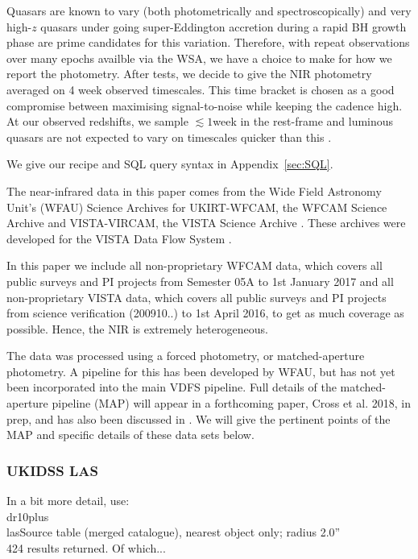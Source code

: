 \documentclass[usenatbib]{mnras}
\begin{document}
Quasars are known to vary (both photometrically and spectroscopically)
and very high-$z$ quasars under going super-Eddington accretion during
a rapid BH growth phase are prime candidates for this variation.
Therefore, with repeat observations over many epochs availble via the
WSA, we have a choice to make for how we report the photometry. After
tests, we decide to give the NIR photometry averaged on 4 week
observed timescales. This time bracket is chosen as a good compromise
between maximising signal-to-noise while keeping the cadence high. At
our observed redshifts, we sample $\lesssim1$week in the rest-frame
and luminous quasars are not expected to vary on timescales quicker
than this \citep[e.g., ][]{Lawrence2016_ASPC}. 
 
We give our recipe and SQL query syntax in Appendix~\ref{sec:SQL}.

The near-infrared data in this paper comes from the Wide Field Astronomy Unit's
(WFAU) Science Archives for UKIRT-WFCAM, the WFCAM Science Archive
\citep[WSA][]{WSA} and VISTA-VIRCAM, the VISTA Science Archive
\citep[VSA][]{VSA}. These archives were developed for the VISTA Data Flow System
\citep[VDFS][]{VDFS}.

In this paper we include all non-proprietary WFCAM data, which covers all
public surveys and PI projects from Semester 05A to 1st January 2017 and all
non-proprietary VISTA data, which covers all public surveys and PI projects from
science verification (200910..) to 1st April 2016, to get as much coverage as
possible. Hence, the NIR is extremely heterogeneous. 

The data was processed using a forced photometry, or matched-aperture
photometry. A pipeline for this has been developed by WFAU, but
has not yet been incorporated into the main VDFS pipeline. Full details of the
matched-aperture pipeline (MAP) will appear in a forthcoming paper, Cross et al.
2018, in prep, and has also been discussed in \citet{Cross2013}.  
We will give the pertinent points of the MAP and specific details of these data sets below.

    \subsubsection{UKIDSS LAS} 
    In a bit more detail, use:\\
    dr10plus\\
    lasSource table (merged catalogue), nearest object only; radius 2.0'' \\
    424 results returned. Of which...
    
\end{document}
